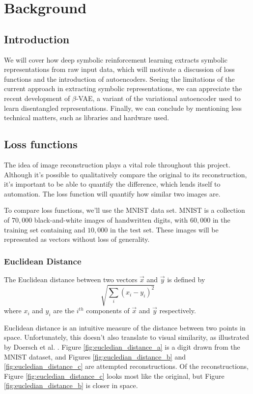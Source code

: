 \chapter{Background}

\label{ch:background}

\section{Introduction}

We will cover how deep symbolic reinforcement learning extracts symbolic representations from raw input data, which will motivate a discussion of loss functions and the introduction of autoencoders. Seeing the limitations of the current approach in extracting symbolic representations, we can appreciate the recent development of $\beta$-VAE, a variant of the variational autoencoder used to learn disentangled representations. Finally, we can conclude by mentioning less technical matters, such as libraries and hardware used.

\section{Loss functions}

The idea of image reconstruction plays a vital role throughout this project. Although it's possible to qualitatively compare the original to its reconstruction, it's important to be able to quantify the difference, which lends itself to automation. The loss function will quantify how similar two images are.

To compare loss functions, we'll use the MNIST data set. MNIST is a collection of $70,000$ black-and-white images of handwritten digits, with $60,000$ in the training set containing and $10,000$ in the test set. These images will be represented as vectors without loss of generality.

\subsection{Euclidean Distance}

The Euclidean distance between two vectors $\vec{x}$ and $\vec{y}$ is defined by $$\sqrt{\sum_{i}(x_i - y_i)^2}$$ where $x_i$ and $y_i$ are the $i^{th}$ components of $\vec{x}$ and $\vec{y}$ respectively.

Euclidean distance is an intuitive measure of the distance between two points in space. Unfortunately, this doesn't also translate to visual similarity, as illustrated by Doersch et al. \cite{Doersch2016}. Figure \ref{fig:eucledian_distance_a} is a digit drawn from the MNIST dataset, and Figures \ref{fig:eucledian_distance_b} and \ref{fig:eucledian_distance_c} are attempted reconstructions. Of the reconstructions, Figure \ref{fig:eucledian_distance_c} looks most like the original, but Figure \ref{fig:eucledian_distance_b} is closer in space.\\

